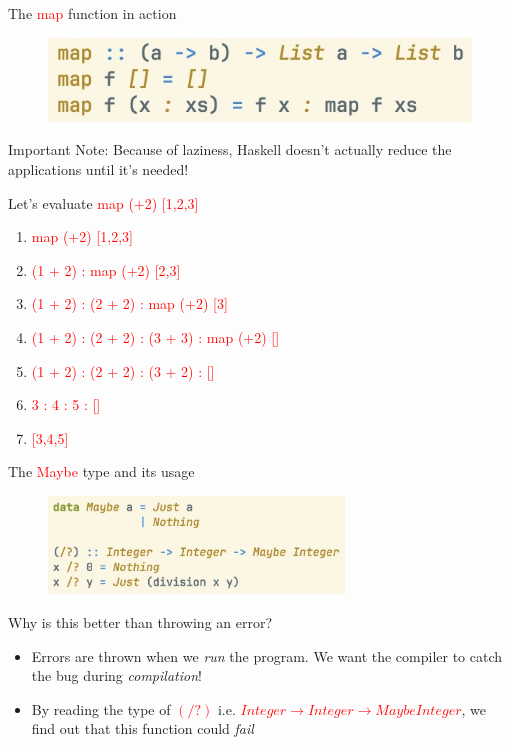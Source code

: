 \documentclass[pdf]{beamer}
\newcommand{\code}[1]{\textcolor{Red}{\textsf{#1}}}
\begin{document}
\begin{frame}{The \code{map} function in action}
  \begin{figure}[H]
    \centering
    \includegraphics[width=\textwidth]{map-hs}
  \end{figure}
  Important Note: Because of laziness, Haskell doesn't actually reduce the applications until it's needed!

  Let's evaluate \code{map (+2) [1,2,3]}
  \begin{enumerate}
  \item<1-> \code{map (+2) [1,2,3]}
  \item<2-> \code{(1 + 2) : map (+2) [2,3]}
  \item<3-> \code{(1 + 2) : (2 + 2) : map (+2) [3]}
  \item<4-> \code{(1 + 2) : (2 + 2) : (3 + 3) : map (+2) []}
  \item<5-> \code{(1 + 2) : (2 + 2) : (3 + 2) : []}
  \item<6-> \code{3 : 4 : 5 : []}
  \item<7-> \code{[3,4,5]}
  \end{enumerate}
\end{frame}

\begin{frame}{The \code{Maybe} type and its usage}
  \begin{figure}[H]
    \centering
    \includegraphics[width=0.70\textwidth]{Maybe-hs}
  \end{figure}
  Why is this better than throwing an error?
  \begin{itemize}
  \item Errors are thrown when we \textit{run} the program. We want the compiler to catch the bug during \textit{compilation}!
  \item By reading the type of \code{$(/?)$} i.e. \code{$Integer \to Integer \to Maybe Integer$}, we find out that this function could \textit{fail}
  \end{itemize}
\end{frame}
\end{document}
